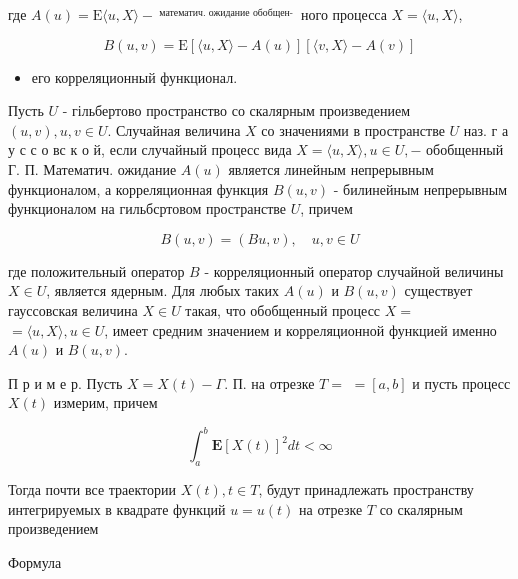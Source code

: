 \documentclass[10pt]{article}
\begin{document}
где $A(u)=\mathrm{E}\langle u, X\rangle-\stackrel{\text { математич. ожидание обобщен- }}{ }$ ного процесса $X=\langle u, X\rangle$,



\[

B(u, v)=\mathrm{E}[\langle u, X\rangle-A(u)][\langle v, X\rangle-A(v)]

\]



\begin{itemize}

  \item его корреляционный функционал.

\end{itemize}



Пусть $U$ - гільбертово пространство со скалярным произведением $(u, v), u, v \in U$. Случайная величина $X$ со значениями в пространстве $U$ наз. г а у с с о вс к о й, если случайный процесс вида $X=\langle u, X\rangle, u \in U,-$ обобщенный Г. П. Математич. ожидание $A(u)$ является линейным непрерывным функционалом, а корреляционная функция $B(u, v)$ - билинейным непрерывным функционалом на гильбсртовом пространстве $U$, причем



\[

B(u, v)=(B u, v), \quad u, v \in U

\]



где положительный оператор $B$ - корреляционный оператор случайной величины $X \in U$, является ядерным. Для любых таких $A(u)$ и $B(u, v)$ существует гауссовская величина $X \in U$ такая, что обобщенный процесс $X=$ $=\langle u, X\rangle, u \in U$, имеет средним значением и корреляционной функцией именно $A(u)$ и $B(u, v)$.



П р и м е р. Пусть $X=X(t)-\Gamma$. П. на отрезке $T=$ $=[a, b]$ и пусть процесс $X(t)$ измерим, причем



\[

\int_{a}^{b} \mathbf{E}[X(t)]^{2} d t<\infty

\]



Тогда почти все траектории $X(t), t \in T$, будут принадлежать пространству интегрируемых в квадрате функций $u=u(t)$ на отрезке $T$ со скалярным произведением



Формула
\end{document}
